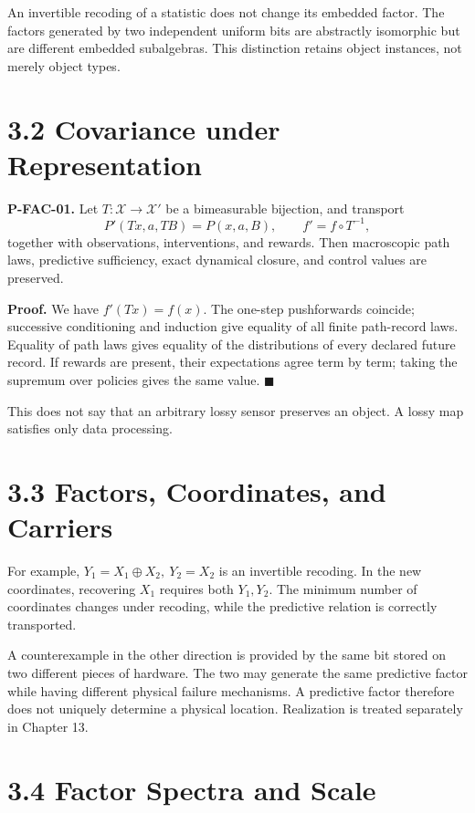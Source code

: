\documentclass[
  english,
  11pt,
  oneside]{book}
\begin{document}
An invertible recoding of a statistic does not change its embedded factor. The factors generated by two independent uniform bits are abstractly isomorphic but are different embedded subalgebras. This distinction retains object instances, not merely object types.

\section{3.2 Covariance under Representation}\label{covariance-under-representation}

\hypertarget{p-fac-01}{}\label{p-fac-01}

\textbf{P-FAC-01.} Let \(T:\mathcal X\to\mathcal X'\) be a bimeasurable bijection, and transport \[P'(Tx,a,T B)=P(x,a,B),\qquad f'=f\circ T^{-1},\] together with observations, interventions, and rewards. Then macroscopic path laws, predictive sufficiency, exact dynamical closure, and control values are preserved.

\textbf{Proof.} We have \(f'(Tx)=f(x)\). The one-step pushforwards coincide; successive conditioning and induction give equality of all finite path-record laws. Equality of path laws gives equality of the distributions of every declared future record. If rewards are present, their expectations agree term by term; taking the supremum over policies gives the same value. \(\blacksquare\)

This does not say that an arbitrary lossy sensor preserves an object. A lossy map satisfies only data processing.

\section{3.3 Factors, Coordinates, and Carriers}\label{factors-coordinates-and-carriers}

For example, \(Y_1=X_1\oplus X_2,\ Y_2=X_2\) is an invertible recoding. In the new coordinates, recovering \(X_1\) requires both \(Y_1,Y_2\). The minimum number of coordinates changes under recoding, while the predictive relation is correctly transported.

A counterexample in the other direction is provided by the same bit stored on two different pieces of hardware. The two may generate the same predictive factor while having different physical failure mechanisms. A predictive factor therefore does not uniquely determine a physical location. Realization is treated separately in Chapter 13.

\section{3.4 Factor Spectra and Scale}\label{factor-spectra-and-scale}
\end{document}
